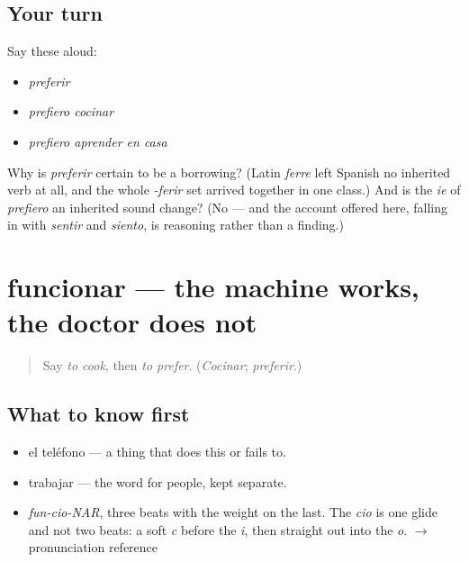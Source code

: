 \subsection*{Your turn}
Say these aloud:

\begin{itemize}
\raggedright
  \item \emph{preferir}
  \item \emph{prefiero cocinar}
  \item \emph{prefiero aprender en casa}
\end{itemize}

\begin{tcolorbox}[breakable,colback=teal!4,colframe=teal!35!black,title={Before you move on}]
Why is \emph{preferir} certain to be a borrowing? (Latin \emph{ferre} left Spanish no inherited verb at all, and the whole \emph{-ferir} set arrived together in one class.) And is the \emph{ie} of \emph{prefiero} an inherited sound change? (No — and the account offered here, falling in with \emph{sentir} and \emph{siento}, is reasoning rather than a finding.)
\end{tcolorbox}
\section[funcionar]{funcionar — the machine works, the doctor does not}

\label{lesson:ES-C396-funcionar}



\begin{quote}
Say \emph{to cook}, then \emph{to prefer}. (\emph{Cocinar}; \emph{preferir}.)
\end{quote}

\subsection*{What to know first}
\begin{itemize}
\raggedright
  \item el teléfono — a thing that does this or fails to.
  \item trabajar — the word for people, kept separate.
\end{itemize}

\begin{sounds}
\begin{itemize}
\raggedright
  \item \emph{fun-cio-NAR}, three beats with the weight on the last. The \emph{cio} is one glide and not two beats: a soft \emph{c} before the \emph{i}, then straight out into the \emph{o}. $\to$ pronunciation reference
\end{itemize}
\end{sounds}

